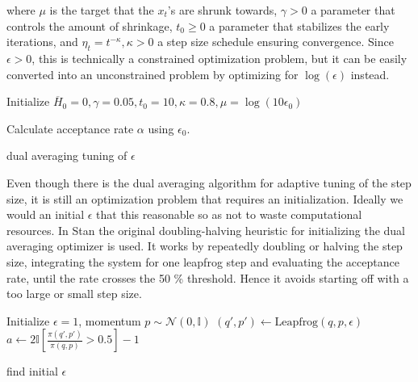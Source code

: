 \documentclass[12pt]{report}
\begin{document}
where $\mu$ is the target that the $x_t$'s are shrunk towards, $\gamma > 0$ a
parameter that controls the amount of shrinkage, $t_0 \ge 0$ a parameter that
stabilizes the early iterations, and $\eta_t = t^{-\kappa},\kappa>0$  a
step size schedule ensuring convergence. Since $\epsilon>0$, this is technically
a constrained optimization problem, but it can be easily converted into an
unconstrained problem by optimizing for $\log(\epsilon)$ instead. 

\begin{algorithm}

Initialize $\overline{H}_0 = 0, \gamma = 0.05, t_0 = 10 ,\kappa = 0.8 , \mu = \log(10\epsilon_0)$ \;
	
	Calculate acceptance rate $\alpha$ using $\epsilon_0$. \;

\caption{dual averaging tuning of $\epsilon$ }
\end{algorithm}

Even though there is the dual averaging algorithm for adaptive tuning of the step size, it is still an optimization problem that requires an initialization. Ideally we would an initial $\epsilon$ that this reasonable so as not to waste computational resources. In Stan the original doubling-halving heuristic for initializing the dual averaging optimizer is used. It works by repeatedly doubling or halving the step size, integrating the system for one leapfrog step and evaluating the acceptance rate, until the rate crosses the 50 \% threshold. Hence it avoids starting off with a too large or small step size. 
\begin{algorithm}
Initialize $\epsilon = 1$, momentum $p \sim \mathcal{N}(0,\mathbb{I}) $ \;
$(q',p') \leftarrow \text{Leapfrog}(q,p,\epsilon) $ \;
$a \leftarrow 2 \mathbb{I}[ \frac{\pi(q',p')}{\pi(q,p)} > 0.5 ] -1 $\;
\KwRet{$\epsilon$}
\caption{find initial $\epsilon$} 
\end{algorithm}
\end{document}
